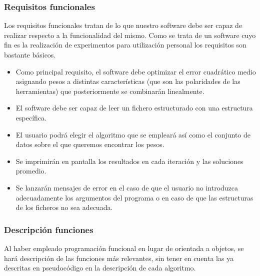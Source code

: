 \subsubsection{Requisitos funcionales}
Los requisitos funcionales tratan de lo que nuestro software debe ser capaz de realizar respecto a la funcionalidad del mismo. Como se trata de un software cuyo fin es la realización de experimentos para utilización personal los requisitos son bastante básicos.
\begin{itemize}
	\item Como principal requisito, el software debe optimizar el error cuadrático medio asignando pesos a distintas características (que son las polaridades de las herramientas) que posteriormente se combinarán linealmente.
	\item El software debe ser capaz de leer un fichero estructurado con una estructura específica.
	\item El usuario podrá elegir el algoritmo que se empleará así como el conjunto de datos sobre el que queremos encontrar los pesos.
	\item Se imprimirán en pantalla los resultados en cada iteración y las soluciones promedio.
	\item Se lanzarán mensajes de error en el caso de que el usuario no introduzca adecuadamente los argumentos del programa o en caso de que las estructuras de los ficheros no sea adecuada.
\end{itemize}

\subsubsection{Descripción funciones}
Al haber empleado programación funcional en lugar de orientada a objetos, se hará descripción de las funciones más relevantes, sin tener en cuenta las ya descritas en pseudocódigo en la descripción de cada algoritmo.


